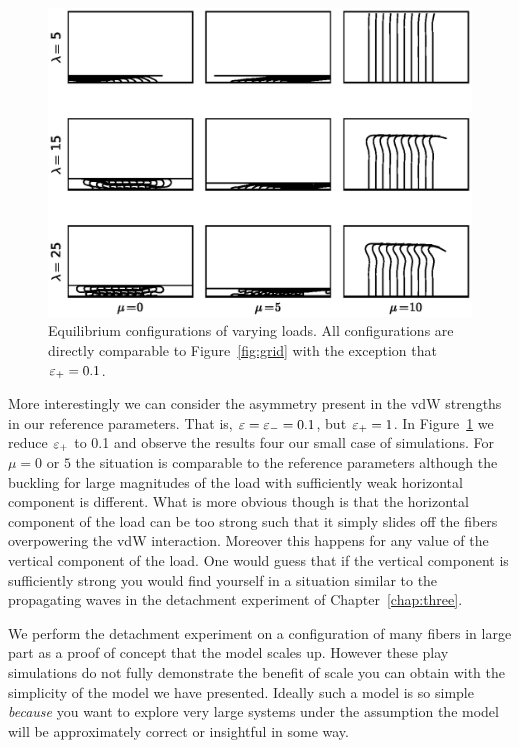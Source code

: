	\begin{figure}
		\begin{center}
			\includegraphics[scale=1]{./fig/ch4/grid_et0.1.eps}
		\end{center}		
		\caption{Equilibrium configurations of varying loads. All configurations are directly comparable to Figure~\ref{fig:grid} with the exception that $\varepsilon_+ = 0.1$.
		\label{fig:grid_et0.1}}
	\end{figure}

	More interestingly we can consider the asymmetry present in the vdW strengths in our reference parameters. That is, $\varepsilon = \varepsilon_- = 0.1$, but $\varepsilon_+ = 1$. In Figure~\ref{fig:grid_et0.1} we reduce $\varepsilon_+$ to 0.1 and observe the results four our small case of simulations. For $\mu = 0$ or $5$ the situation is comparable to the reference parameters although the buckling for large magnitudes of the load with sufficiently weak horizontal component is different. What is more obvious though is that the horizontal component of the load can be too strong such that it simply slides off the fibers overpowering the vdW interaction. Moreover this happens for any value of the vertical component of the load. One would guess that if the vertical component is sufficiently strong you would find yourself in a situation similar to the propagating waves in the detachment experiment of Chapter~\ref{chap:three}.
	
	We perform the detachment experiment on a configuration of many fibers in large part as a proof of concept that the model scales up. However these play simulations do not fully demonstrate the benefit of scale you can obtain with the simplicity of the model we have presented. Ideally such a model is so simple \textit{because} you want to explore very large systems under the assumption the model will be approximately correct or insightful in some way.


	